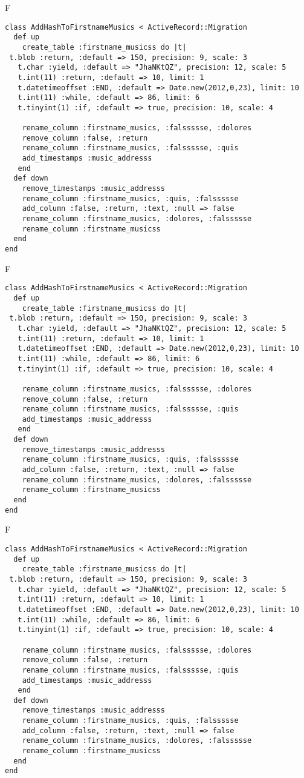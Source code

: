 F
\begin{verbatim}
class AddHashToFirstnameMusics < ActiveRecord::Migration
  def up
    create_table :firstname_musicss do |t| 
 t.blob :return, :default => 150, precision: 9, scale: 3
   t.char :yield, :default => "JhaNKtQZ", precision: 12, scale: 5
   t.int(11) :return, :default => 10, limit: 1
   t.datetimeoffset :END, :default => Date.new(2012,0,23), limit: 10
   t.int(11) :while, :default => 86, limit: 6
   t.tinyint(1) :if, :default => true, precision: 10, scale: 4

    rename_column :firstname_musics, :falssssse, :dolores
    remove_column :false, :return
    rename_column :firstname_musics, :falssssse, :quis
    add_timestamps :music_addresss
   end
  def down
    remove_timestamps :music_addresss
    rename_column :firstname_musics, :quis, :falssssse
    add_column :false, :return, :text, :null => false
    rename_column :firstname_musics, :dolores, :falssssse
    rename_column :firstname_musicss
  end
end
\end{verbatim}

F
\begin{verbatim}
class AddHashToFirstnameMusics < ActiveRecord::Migration
  def up
    create_table :firstname_musicss do |t| 
 t.blob :return, :default => 150, precision: 9, scale: 3
   t.char :yield, :default => "JhaNKtQZ", precision: 12, scale: 5
   t.int(11) :return, :default => 10, limit: 1
   t.datetimeoffset :END, :default => Date.new(2012,0,23), limit: 10
   t.int(11) :while, :default => 86, limit: 6
   t.tinyint(1) :if, :default => true, precision: 10, scale: 4

    rename_column :firstname_musics, :falssssse, :dolores
    remove_column :false, :return
    rename_column :firstname_musics, :falssssse, :quis
    add_timestamps :music_addresss
   end
  def down
    remove_timestamps :music_addresss
    rename_column :firstname_musics, :quis, :falssssse
    add_column :false, :return, :text, :null => false
    rename_column :firstname_musics, :dolores, :falssssse
    rename_column :firstname_musicss
  end
end
\end{verbatim}

F
\begin{verbatim}
class AddHashToFirstnameMusics < ActiveRecord::Migration
  def up
    create_table :firstname_musicss do |t| 
 t.blob :return, :default => 150, precision: 9, scale: 3
   t.char :yield, :default => "JhaNKtQZ", precision: 12, scale: 5
   t.int(11) :return, :default => 10, limit: 1
   t.datetimeoffset :END, :default => Date.new(2012,0,23), limit: 10
   t.int(11) :while, :default => 86, limit: 6
   t.tinyint(1) :if, :default => true, precision: 10, scale: 4

    rename_column :firstname_musics, :falssssse, :dolores
    remove_column :false, :return
    rename_column :firstname_musics, :falssssse, :quis
    add_timestamps :music_addresss
   end
  def down
    remove_timestamps :music_addresss
    rename_column :firstname_musics, :quis, :falssssse
    add_column :false, :return, :text, :null => false
    rename_column :firstname_musics, :dolores, :falssssse
    rename_column :firstname_musicss
  end
end
\end{verbatim}

